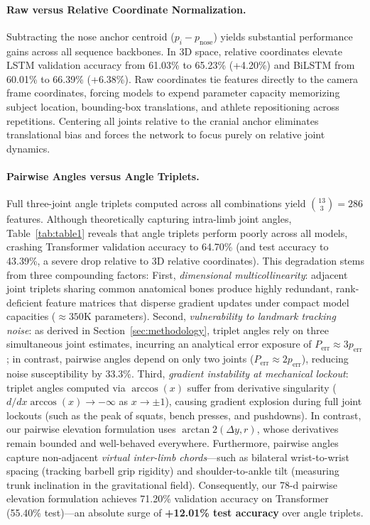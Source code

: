 \documentclass[preprint,12pt]{elsarticle}
\begin{document}
\paragraph{Raw versus Relative Coordinate Normalization.} Subtracting the nose anchor centroid ($p_i - p_{\text{nose}}$) yields substantial performance gains across all sequence backbones. In 3D space, relative coordinates elevate LSTM validation accuracy from 61.03\% to 65.23\% (+4.20\%) and BiLSTM from 60.01\% to 66.39\% (+6.38\%). Raw coordinates tie features directly to the camera frame coordinates, forcing models to expend parameter capacity memorizing subject location, bounding-box translations, and athlete repositioning across repetitions. Centering all joints relative to the cranial anchor eliminates translational bias and forces the network to focus purely on relative joint dynamics.

\paragraph{Pairwise Angles versus Angle Triplets.} Full three-joint angle triplets computed across all combinations yield $\binom{13}{3} = 286$ features. Although theoretically capturing intra-limb joint angles, Table~\ref{tab:table1} reveals that angle triplets perform poorly across all models, crashing Transformer validation accuracy to 64.70\% (and test accuracy to 43.39\%, a severe drop relative to 3D relative coordinates). This degradation stems from three compounding factors:
First, \textit{dimensional multicollinearity}: adjacent joint triplets sharing common anatomical bones produce highly redundant, rank-deficient feature matrices that disperse gradient updates under compact model capacities ($\approx 350\text{K}$ parameters).
Second, \textit{vulnerability to landmark tracking noise}: as derived in Section~\ref{sec:methodology}, triplet angles rely on three simultaneous joint estimates, incurring an analytical error exposure of $P_{\text{err}} \approx 3p_{\text{err}}$; in contrast, pairwise angles depend on only two joints ($P_{\text{err}} \approx 2p_{\text{err}}$), reducing noise susceptibility by 33.3\%.
Third, \textit{gradient instability at mechanical lockout}: triplet angles computed via $\arccos(x)$ suffer from derivative singularity ($d/dx \arccos(x) \to -\infty$ as $x \to \pm 1$), causing gradient explosion during full joint lockouts (such as the peak of squats, bench presses, and pushdowns). In contrast, our pairwise elevation formulation uses $\arctan2(\Delta y, r)$, whose derivatives remain bounded and well-behaved everywhere.
Furthermore, pairwise angles capture non-adjacent \textit{virtual inter-limb chords}---such as bilateral wrist-to-wrist spacing (tracking barbell grip rigidity) and shoulder-to-ankle tilt (measuring trunk inclination in the gravitational field). Consequently, our 78-d pairwise elevation formulation achieves 71.20\% validation accuracy on Transformer (55.40\% test)---an absolute surge of \textbf{+12.01\% test accuracy} over angle triplets.
\end{document}
